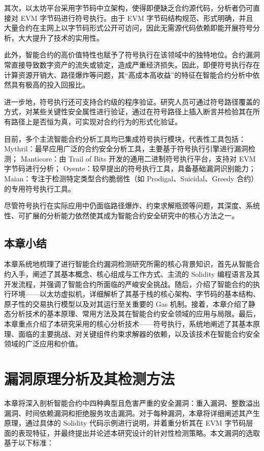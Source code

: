 \documentclass[print, master, vlined, timesmath]{DissertUESTC}
\begin{document}
其次，以太坊平台采用字节码中立架构，使得即便缺乏合约源代码，分析者仍可直接对 EVM 字节码进行符号执行。由于 EVM 字节码结构规范、形式明确，并且大量合约在主网上以字节码形式公开可访问，因此无需源代码依赖即能开展符号分析，大大提升了技术的实用性。

此外，智能合约的高价值特性也赋予了符号执行在该领域中的独特地位。合约漏洞常直接导致数字资产的流失或锁定，造成严重经济损失。因此，即便符号执行存在计算资源开销大、路径爆炸等问题，其“高成本高收益”的特征在智能合约分析中依然具有极高的投入回报比。


进一步地，符号执行还可支持合约级的程序验证。研究人员可通过符号路径覆盖的方式，对某些关键性安全属性进行验证，通过在符号路径上插入断言并检验其在所有路径上是否恒为真，可实现对合约行为的形式化验证。

目前，多个主流智能合约分析工具均已集成符号执行模块，代表性工具包括：
Mythril：最早应用广泛的合约安全分析工具，主要基于符号执行引擎进行漏洞检测；
Manticore：由 Trail of Bits 开发的通用二进制符号执行平台，支持对 EVM 字节码进行分析；
Oyente：较早提出的符号执行工具，具备基础漏洞识别能力；
Maian：专注于检测特定类型合约脆弱性（如 Prodigal、Suicidal、Greedy 合约）的专用符号执行工具。

尽管符号执行在实际应用中仍面临路径爆炸、约束求解瓶颈等问题，其深度、系统性、可扩展的分析能力依然使其成为智能合约安全研究中的核心方法之一。
\section{本章小结}
本章系统地梳理了进行智能合约漏洞检测研究所需的核心背景知识，首先从智能合约入手，阐述了其基本概念、核心组成与工作方式、主流的 Solidity 编程语言及其开发流程，并强调了智能合约所面临的严峻安全挑战。随后，介绍了智能合约的执行环境——以太坊虚拟机，详细解析了其基于栈的核心架构、字节码的基本结构、原子性的交易执行模型以及对其运行至关重要的 Gas 机制。接着，本章介绍了静态分析技术的基本原理、常用方法及其在智能合约安全领域的应用与局限。最后，本章重点介绍了本研究采用的核心分析技术——符号执行，系统地阐述了其基本原理、面临的主要挑战、对关键组件约束求解器的依赖，以及该技术在智能合约安全领域的广泛应用和价值。
\chapter{漏洞原理分析及其检测方法}
本章将深入剖析智能合约中四种典型且危害严重的安全漏洞：重入漏洞、整数溢出漏洞、时间依赖漏洞和拒绝服务攻击漏洞。对于每种漏洞，本章将详细阐述其产生原理，通过具体的 Solidity 代码示例进行说明，并着重分析其在 EVM 字节码层面的表现特征，并最终提出并论述本研究设计的针对性检测策略。本文漏洞的选取基于以下标准：
\end{document}
